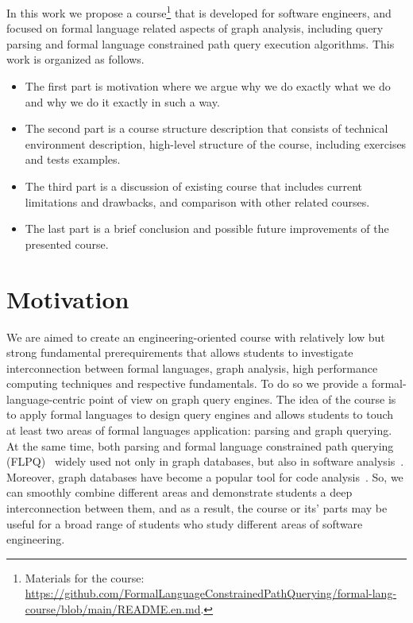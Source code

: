 \documentclass[sigconf]{acmart}
\begin{document}
In this work we propose a course\footnote{Materials for the course: \url{https://github.com/FormalLanguageConstrainedPathQuerying/formal-lang-course/blob/main/README.en.md}.} that is developed for software engineers, and focused on formal language related aspects of graph analysis, including query parsing and formal language constrained path query execution algorithms.
This work is organized as follows.
\begin{itemize}
  \item The first part is motivation where we argue why we do exactly what we do and why we do it exactly in such a way. 
  \item The second part is a course structure description that consists of technical environment description, high-level structure of the course, including exercises and tests examples.
  \item The third part is a discussion of existing course that includes current limitations and drawbacks, and comparison with other related courses.
  \item The last part is a brief conclusion and possible future improvements of the presented course.
\end{itemize}  

\section{Motivation}

We are aimed to create an engineering-oriented course with relatively low but strong fundamental prerequirements that allows students to investigate interconnection between formal languages, graph analysis, high performance computing techniques and respective fundamentals.
To do so we provide a formal-language-centric point of view on graph query engines.
The idea of the course is to apply formal languages to design query engines and allows students to touch at least two areas of formal languages application: parsing and graph querying.
At the same time, both parsing and formal language constrained path querying (FLPQ)~\cite{10.1137/S0097539798337716} widely used not only in graph databases, but also in software analysis~\cite{10.1145/3583660.3583664}.
Moreover, graph databases have become a popular tool for code analysis~\cite{URMA2015127}.
So, we can smoothly combine different areas and demonstrate students a deep interconnection between them, and as a result, the course or its' parts may be useful for a broad range of students who study different areas of software engineering.
\end{document}
